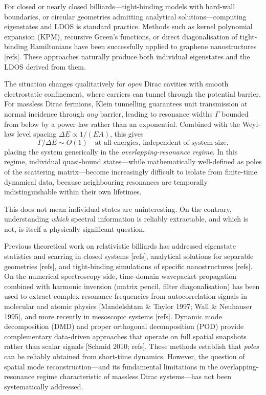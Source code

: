 \documentclass[11pt,a4paper]{article}
\begin{document}

For closed or nearly closed billiards---tight-binding models with
hard-wall boundaries, or circular geometries admitting analytical
solutions---computing eigenstates and LDOS is standard practice.
Methods such as kernel polynomial expansion (KPM), recursive
Green's functions, or direct diagonalisation of tight-binding
Hamiltonians have been successfully applied to graphene nanostructures
[refs].  These approaches naturally produce both individual
eigenstates and the LDOS derived from them.


The situation changes qualitatively for \emph{open} Dirac cavities
with smooth electrostatic confinement, where carriers can tunnel
through the potential barrier.  For massless Dirac fermions, Klein
tunnelling guarantees unit transmission at normal incidence through
\emph{any} barrier, leading to resonance widths $\Gamma$ bounded
from below by a power law rather than an exponential.  Combined with
the Weyl-law level spacing $\Delta E \propto 1/(EA)$, this gives
\begin{equation}
  \Gamma / \Delta E \sim O(1)
  \quad \text{at all energies, independent of system size,}
\end{equation}
placing the system generically in the \emph{overlapping-resonance
regime}.  In this regime, individual quasi-bound states---while
mathematically well-defined as poles of the scattering matrix---become
increasingly difficult to isolate from finite-time dynamical data,
because neighbouring resonances are temporally indistinguishable
within their own lifetimes.

This does not mean individual states are uninteresting.  On the
contrary, understanding \emph{which} spectral information is reliably
extractable, and which is not, is itself a physically significant
question.


Previous theoretical work on relativistic billiards has addressed
eigenstate statistics and scarring in closed systems
[refs], analytical solutions for separable geometries [refs],
and tight-binding simulations of specific nanostructures [refs].
On the numerical spectroscopy side, time-domain wavepacket
propagation combined with harmonic inversion (matrix pencil,
filter diagonalisation) has been used to extract complex resonance
frequencies from autocorrelation signals in molecular and atomic
physics [Mandelshtam \& Taylor 1997; Wall \& Neuhauser 1995],
and more recently in mesoscopic systems [refs].
Dynamic mode decomposition (DMD) and proper orthogonal
decomposition (POD) provide complementary data-driven approaches
that operate on full spatial snapshots rather than scalar signals
[Schmid 2010; refs].
These methods establish that \emph{poles} can be reliably obtained
from short-time dynamics.  However, the question of spatial mode
reconstruction---and its fundamental limitations in the
overlapping-resonance regime characteristic of massless Dirac
systems---has not been systematically addressed.
\end{document}
